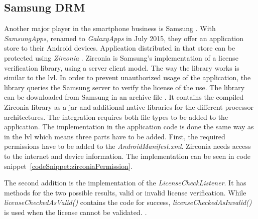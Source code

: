 \subsection{Samsung DRM} \label{section:license-samsung}
Another major player in the smartphone business is Samsung \cite{comscoreMarket}.
With \textit{SamsungApps}, renamed to \textit{GalaxyApps} in July 2015, they offer an application store to their Android devices.
Application distributed in that store can be protected using \textit{Zirconia} \cite{samsungZirconia}.
Zirconia is Samsung’s implementation of a license verification library, using a server client model.
\newline
The way the library works is similar to the \gls{lvl}.
In order to prevent unauthorized usage of the application, the library queries the Samsung server to verify the license of the use.
The library can be downloaded from Samsung in an archive file \cite{samsungZirconia}.
It contains the compiled Zirconia library as a \gls{jar} and additional native libraries for the different processor architectures.
The integration requires both file types to be added to the application.
The implementation in the application code is done the same way as in the \gls{lvl} which means three parts have to be added.
\newline
First, the required permissions have to be added to the \textit{AndroidManifest.xml}.
Zirconia needs access to the internet and device information.
The implementation can be seen in code snippet~\ref{codeSnippet:zirconiaPermission}.
\newline

The second addition is the implementation of the \textit{LicenseCheckListener}.
It has methods for the two possible results, valid or invalid license verification.
While \textit{licenseCheckedAsValid()} contains the code for success, \textit{licenseCheckedAsInvalid()} is used when the license cannot be validated.
\textit.


